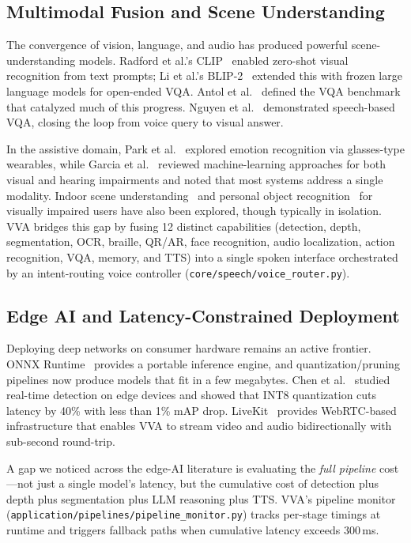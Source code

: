 \subsection{Multimodal Fusion and Scene Understanding}

The convergence of vision, language, and audio has produced powerful scene-understanding models. Radford et al.'s CLIP~\cite{radford2021clip} enabled zero-shot visual recognition from text prompts; Li et al.'s BLIP-2~\cite{li2023blip2} extended this with frozen large language models for open-ended VQA. Antol et al.~\cite{antol2015vqa} defined the VQA benchmark that catalyzed much of this progress. Nguyen et al.~\cite{sbvqa2023} demonstrated speech-based VQA, closing the loop from voice query to visual answer.

In the assistive domain, Park et al.~\cite{emotion_recognition_wearable2022} explored emotion recognition via glasses-type wearables, while Garcia et al.~\cite{enhancing_accessibility_ml_review2024} reviewed machine-learning approaches for both visual and hearing impairments and noted that most systems address a single modality. Indoor scene understanding~\cite{ria_scene_understanding2022} and personal object recognition~\cite{frobt_assistive_robot2019} for visually impaired users have also been explored, though typically in isolation. VVA bridges this gap by fusing 12 distinct capabilities (detection, depth, segmentation, OCR, braille, QR/AR, face recognition, audio localization, action recognition, VQA, memory, and TTS) into a single spoken interface orchestrated by an intent-routing voice controller (\texttt{core/speech/voice\_router.py}).

\subsection{Edge AI and Latency-Constrained Deployment}

Deploying deep networks on consumer hardware remains an active frontier. ONNX Runtime~\cite{onnxruntime2019} provides a portable inference engine, and quantization/pruning pipelines now produce models that fit in a few megabytes. Chen et al.~\cite{eswa_edge_ai_pipeline2020} studied real-time detection on edge devices and showed that INT8 quantization cuts latency by 40\% with less than 1\% mAP drop. LiveKit~\cite{livekit2023} provides WebRTC-based infrastructure that enables VVA to stream video and audio bidirectionally with sub-second round-trip. 

A gap we noticed across the edge-AI literature is evaluating the \emph{full pipeline} cost---not just a single model's latency, but the cumulative cost of detection plus depth plus segmentation plus LLM reasoning plus TTS. VVA's pipeline monitor (\texttt{application/pipelines/pipeline\_monitor.py}) tracks per-stage timings at runtime and triggers fallback paths when cumulative latency exceeds 300\,ms.

